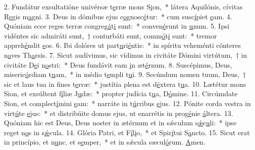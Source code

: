 2. Fundátur exsultatióne univérsæ t\uline{e}rræ mons S\uline{i}on,~* látera Aquilónis, cívitas R\uline{e}gis m\uline{a}gni.
3. Deus in dómibus ejus c\uline{o}gnosc\uline{é}tur:~* cum susc\uline{í}piet \uline{e}am.
4. Quóniam ecce reges terræ congreg\uline{á}t\uline{i} sunt:~* conven\uline{é}runt in \uline{u}num.
5. Ipsi vidéntes sic admiráti sunt,~† conturbáti sunt, comm\uline{ó}t\uline{i} sunt:~* tremor appreh\uline{é}ndit \uline{e}os.
6. Ibi dolóres ut part\uline{u}ri\uline{é}ntis:~* in spíritu veheménti cónteres n\uline{a}ves Th\uline{a}rsis.
7. Sicut audívimus, sic vídimus in civitáte Dómini virtútum,~† in civitáte D\uline{e}i n\uline{o}stri:~* Deus fundávit eam \uline{i}n æt\uline{é}rnum.
8. Suscépimus, Deus, miseric\uline{ó}rdiam t\uline{u}am,~* in médio t\uline{e}mpli t\uline{u}i.
9. Secúndum nomen tuum, Deus,~† sic et laus tua in f\uline{i}nes t\uline{e}rræ:~* justítia plena est d\uline{é}xtera t\uline{u}a.
10. Lætétur mons Sion, et exsúltent f\uline{í}liæ J\uline{u}dæ:~* propter judícia t\uline{u}a, D\uline{ó}mine.
11. Circúmdate Sion, et complect\uline{í}mini \uline{e}am:~* narráte in t\uline{ú}rribus \uline{e}jus.
12. Pónite corda vestra in virt\uline{ú}te \uline{e}jus:~* et distribúite domus ejus, ut enarrétis in prog\uline{é}nie \uline{á}ltera.
13. Quóniam hic est Deus, Deus noster in ætérnum et in sǽculum s\uline{ǽ}c\uline{u}li:~* ipse reget n\uline{o}s in s\uline{ǽ}cula.
14. Glória Patri, et F\uline{í}l\uline{i}o,~* et Spir\uline{í}tui S\uline{a}ncto.
15. Sicut erat in princípio, et n\uline{u}nc, et s\uline{e}mper,~* et in sǽcula sæcul\uline{ó}rum. \uline{A}men.
